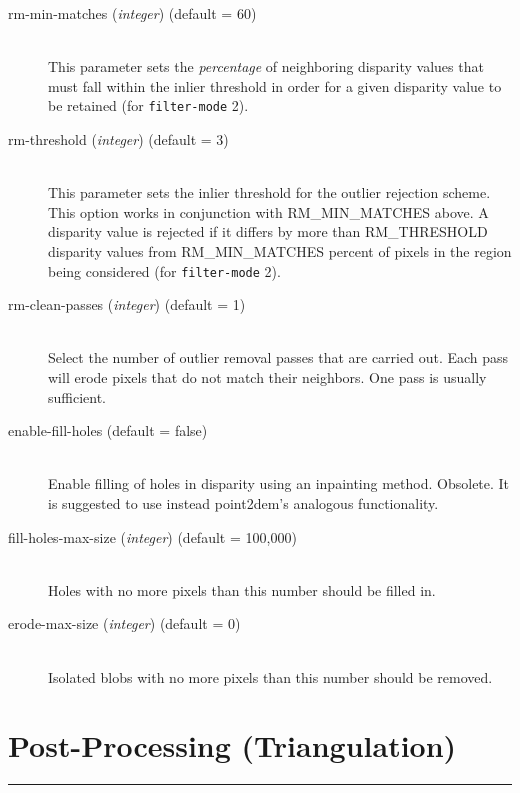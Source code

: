 \begin{description}
\item[rm-min-matches \textnormal{\small{(\emph{integer})}} (default = 60)] \hfill \\
  This parameter sets the {\em percentage} of neighboring disparity
  values that must fall within the inlier threshold in order for a
  given disparity value to be retained (for \texttt{filter-mode} 2).

\item[rm-threshold \textnormal{\small{(\emph{integer})}} (default = 3)] \hfill \\
  This parameter sets the inlier threshold for the outlier rejection
  scheme.  This option works in conjunction with RM\_MIN\_MATCHES
  above.  A disparity value is rejected if it differs by more than
  RM\_THRESHOLD disparity values from RM\_MIN\_MATCHES percent of
  pixels in the region being considered  (for \texttt{filter-mode} 2).

\item[rm-clean-passes \textnormal{\small{(\emph{integer})}} (default = 1)] \hfill \\
  Select the number of outlier removal passes that are carried out.
  Each pass will erode pixels that do not match their neighbors.  One
  pass is usually sufficient.

\item[enable-fill-holes (default = false)] \hfill \\

Enable filling of holes in disparity using an inpainting
method. Obsolete. It is suggested to use instead point2dem's analogous
functionality.

\item[fill-holes-max-size \textnormal{\small{(\emph{integer})}} (default = 100,000)] \hfill \\
  Holes with no more pixels than this number should be filled in.

\item[erode-max-size \textnormal{\small{(\emph{integer})}} (default = 0)] \hfill \\
  Isolated blobs with no more pixels than this number should be removed.

\end{description}


\section{Post-Processing (Triangulation)}
\label{triangulation_options}
\hrule
\bigskip

